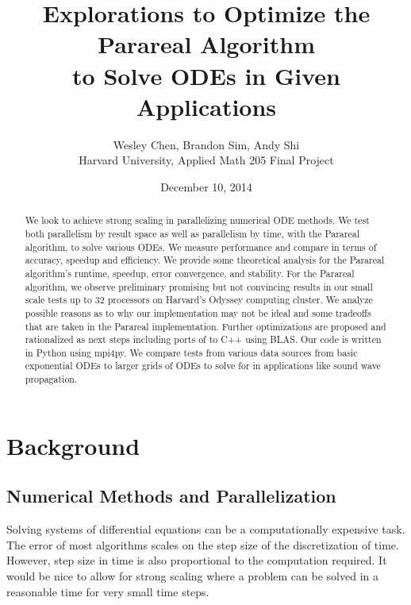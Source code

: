 \documentclass[letterpaper,12pt]{article}
\begin{document}
\title{Explorations to Optimize the Parareal Algorithm \\to Solve ODEs in Given Applications}
\author{Wesley Chen, Brandon Sim, Andy Shi \\
Harvard University, Applied Math 205 Final Project}
\date{December 10, 2014}

\setlength\parindent{0pt}

\setlength\parskip{2ex}

\maketitle
\begin{abstract}
We look to achieve strong scaling in parallelizing numerical ODE methods. We
test both parallelism by result space as well as parallelism by time, with the
Parareal algorithm, to solve various ODEs. We measure performance and compare in
terms of accuracy, speedup and efficiency. We provide some theoretical analysis
for the Parareal algorithm's runtime, speedup, error convergence, and stability.
For the Parareal algorithm, we observe preliminary promising but not convincing
results in our small scale tests up to 32 processors on Harvard's Odyssey
computing cluster. We analyze possible reasons as to why our implementation may
not be ideal and some tradeoffs that are taken in the Parareal implementation.
Further optimizations are proposed and rationalized as next steps including
ports of to C++ using BLAS. Our code is written in Python using mpi4py. We
compare tests from various data sources from basic exponential ODEs to larger
grids of ODEs to solve for in applications like sound wave propagation.

\end{abstract}

\clearpage



\section{Background}

\subsection{Numerical Methods and Parallelization}
Solving systems of differential equations can be a computationally expensive
task. The error of most algorithms scales on the step size of the discretization
of time. However, step size in time is also proportional to the computation
required. It would be nice to allow for strong scaling where a problem can be
solved in a reasonable time for very small time steps.
\end{document}
